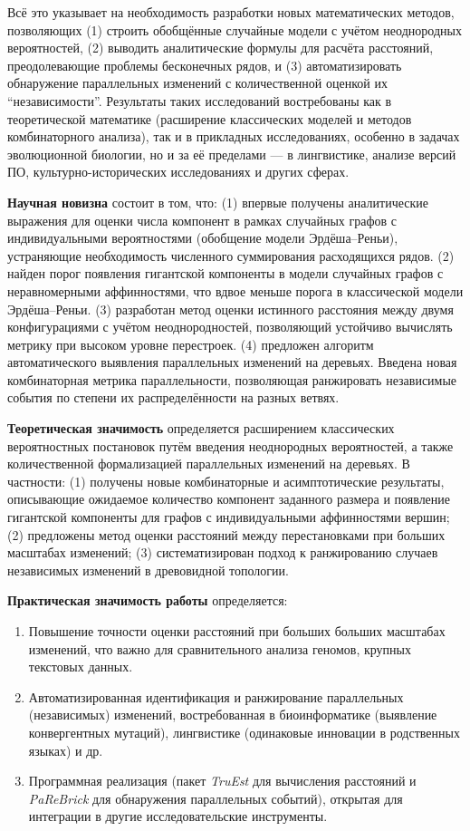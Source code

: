 Всё это указывает на необходимость разработки новых математических методов, позволяющих (1) строить обобщённые случайные модели с учётом неоднородных вероятностей, (2) выводить аналитические формулы для расчёта расстояний, преодолевающие проблемы бесконечных рядов, и (3) автоматизировать обнаружение параллельных изменений с количественной оценкой их ``независимости''.  
Результаты таких исследований востребованы как в теоретической математике (расширение классических моделей и методов комбинаторного анализа), так и в прикладных исследованиях, особенно в задачах эволюционной биологии, но и за её пределами --- в лингвистике, анализе версий ПО, культурно-исторических исследованиях и других сферах.  

\textbf{Научная новизна} состоит в том, что: 
(1) впервые получены аналитические выражения для оценки числа компонент в рамках случайных графов с индивидуальными вероятностями (обобщение модели Эрдёша--Реньи), устраняющие необходимость численного суммирования расходящихся рядов.
(2) найден порог появления гигантской компоненты в модели случайных графов с неравномерными аффинностями, что вдвое меньше порога в классической модели Эрдёша–Реньи.
(3) разработан метод оценки истинного расстояния между двумя конфигурациями с учётом неоднородностей, позволяющий устойчиво вычислять метрику при высоком уровне перестроек. 
(4) предложен алгоритм автоматического выявления параллельных изменений на деревьях. 
Введена новая комбинаторная метрика параллельности, позволяющая ранжировать независимые события по степени их распределённости на разных ветвях.


\textbf{Теоретическая значимость} определяется расширением классических вероятностных постановок путём введения неоднородных вероятностей, а также количественной формализацией параллельных изменений на деревьях.  
В частности: (1) получены новые комбинаторные и асимптотические результаты, описывающие ожидаемое количество компонент заданного размера и появление гигантской компоненты для графов с индивидуальными аффинностями вершин; 
(2) предложены метод оценки расстояний между перестановками при больших масштабах изменений;
(3) систематизирован подход к ранжированию случаев независимых изменений в древовидной топологии.

\textbf{Практическая значимость работы} определяется:

\begin{enumerate}
    \item Повышение точности оценки расстояний при больших больших масштабах изменений, что важно для сравнительного анализа геномов, крупных текстовых данных.
    \item Автоматизированная идентификация и ранжирование параллельных (независимых) изменений, востребованная в биоинформатике (выявление конвергентных мутаций), лингвистике (одинаковые инновации в родственных языках) и др.
    \item Программная реализация (пакет \emph{TruEst} для вычисления расстояний и \emph{PaReBrick} для обнаружения параллельных событий), открытая для интеграции в другие исследовательские инструменты.
\end{enumerate}

